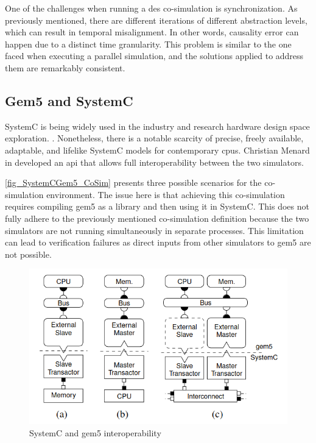 One of the challenges when running a \gls{des} co-simulation is synchronization. As previously mentioned, there are different iterations of different abstraction levels, which can result in temporal misalignment. In other words, causality error can happen due to a distinct time granularity. This problem is similar to the one faced when executing a parallel simulation, and the solutions applied to address them are remarkably consistent. 


\subsection{Gem5 and SystemC}

SystemC is being widely used in the industry and research hardware design space exploration. \cite{menard2017system}. Nonetheless, there is a notable scarcity of precise, freely available, adaptable, and lifelike SystemC models for contemporary \glspl{cpu}. Christian Menard in \cite{menard2017system} developed an \gls{api} that allows full interoperability between the two simulators. 

\autoref{fig_SystemCGem5_CoSim} presents three possible scenarios for the co-simulation environment. The issue here is that achieving this co-simulation requires compiling gem5 as a library and then using it in SystemC. This does not fully adhere to the previously mentioned co-simulation definition because the two simulators are not running simultaneously in separate processes. This limitation can lead to verification failures as direct inputs from other simulators to gem5 are not possible.

\begin{figure}[H]
	\centering
 	\includegraphics[width=0.7\linewidth]{Images/SystemCGem5_CoSim.png}
 	\caption{SystemC and gem5 interoperability \cite{menard2017system}}
	 \label{fig_SystemCGem5_CoSim}
\end{figure}
